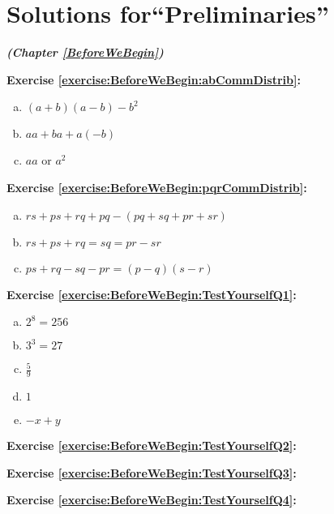 \section{Solutions for``Preliminaries''}
\noindent\textbf{\textit{ (Chapter \ref{BeforeWeBegin})}}\bigskip


\noindent\textbf{Exercise \ref{exercise:BeforeWeBegin:abCommDistrib}:}
\begin{enumerate}[(a)]
\item  $(a+b)(a-b) - b^2$ 
\item  $aa + ba + a(-b)$
\item  $aa$ or $a^2$
\end{enumerate}

\noindent\textbf{Exercise \ref{exercise:BeforeWeBegin:pqrCommDistrib}:}
\begin{enumerate}[(a)]
\item  $rs + ps + rq + pq - (pq + sq + pr + sr)$ 
\item  $rs + ps + rq = sq = pr - sr$
\item  $ ps + rq - sq - pr = (p-q)(s-r)$
\end{enumerate}


\noindent\textbf{Exercise \ref{exercise:BeforeWeBegin:TestYourselfQ1}:}
\begin{enumerate}[(a)]
\item $2^{8} = 256$
\item $3^3 = 27$
\item $\frac{5}{9}$
\item $1$
\item $-x +y$
\end{enumerate}


\noindent\textbf{Exercise \ref{exercise:BeforeWeBegin:TestYourselfQ2}:}

\noindent\textbf{Exercise \ref{exercise:BeforeWeBegin:TestYourselfQ3}:}

\noindent\textbf{Exercise \ref{exercise:BeforeWeBegin:TestYourselfQ4}:}

